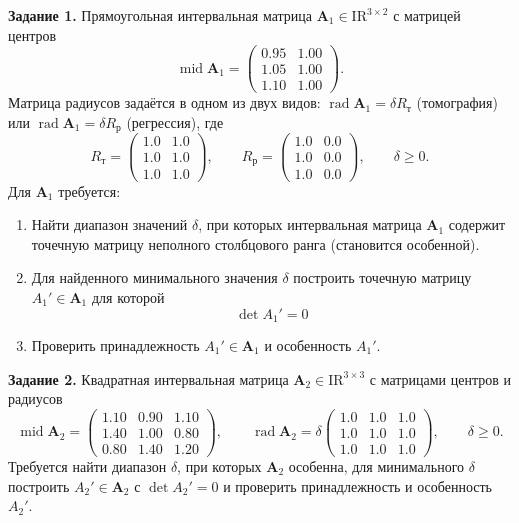 \documentclass[a4paper, 14pt]{extarticle}
\begin{document}
\textbf{Задание 1.} Прямоугольная интервальная матрица $\mathbf{A}_1 \in \mathrm{IR}^{3\times 2}$ с матрицей центров
\begin{equation*}
    \operatorname{mid}\mathbf{A}_1 =
    \begin{pmatrix}
        0.95 & 1.00\\
        1.05 & 1.00\\
        1.10 & 1.00
    \end{pmatrix}.
\end{equation*}
Матрица радиусов задаётся в одном из двух видов: $\operatorname{rad}\mathbf{A}_1 = \delta R_\text{т}$ (томография) или $\operatorname{rad}\mathbf{A}_1 = \delta R_\text{р}$ (регрессия), где
\begin{equation*}
    R_\text{т} =
    \begin{pmatrix}
        1.0 & 1.0\\
        1.0 & 1.0\\
        1.0 & 1.0
    \end{pmatrix},\qquad
    R_\text{р} =
    \begin{pmatrix}
        1.0 & 0.0\\
        1.0 & 0.0\\
        1.0 & 0.0
    \end{pmatrix},
    \qquad\delta \ge0.
\end{equation*}
    Для $\mathbf{A}_1$ требуется:
\begin{enumerate}
    \item Найти диапазон значений $\delta$, при которых интервальная матрица $\mathbf{A}_1$ содержит точечную матрицу неполного столбцового ранга (становится особенной).
    \item Для найденного минимального значения $\delta$ построить точечную матрицу $A_1' \in \mathbf{A}_1$ для которой  \[\operatorname{det} A_1' = 0\]
    \item Проверить принадлежность $A_1' \in \mathbf{A}_1$ и особенность $A_1'$.
\end{enumerate}

\textbf{Задание 2.} Квадратная интервальная матрица $\mathbf{A}_2 \in \mathrm{IR}^{3\times 3}$ с матрицами центров и радиусов
\begin{equation*}
    \operatorname{mid}\mathbf{A}_2 =
    \begin{pmatrix}
        1.10 & 0.90 & 1.10\\
        1.40 & 1.00 & 0.80\\
        0.80 & 1.40 & 1.20
    \end{pmatrix},\qquad
    \operatorname{rad}\mathbf{A}_2 = \delta
    \begin{pmatrix}
        1.0 & 1.0 & 1.0\\
        1.0 & 1.0 & 1.0\\
        1.0 & 1.0 & 1.0
    \end{pmatrix},
    \qquad\delta \ge0.
\end{equation*}
Требуется найти диапазон $\delta$, при которых $\mathbf{A}_2$ особенна, для минимального $\delta$ построить $A_2' \in \mathbf{A}_2$ с $\det A_2' = 0$ и проверить принадлежность и особенность $A_2'$.
\end{document}
